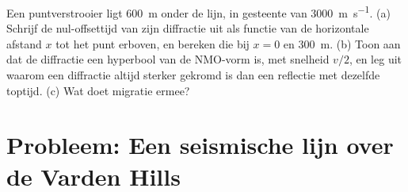 \begin{exercise}[$\star\star\star$]\label{exo:b3:exploration-seismology:12}
Een puntverstrooier ligt \qty{600}{m} onder de lijn, in gesteente van
\qty{3000}{m.s^{-1}}. (a) Schrijf de nul-offsettijd van zijn diffractie uit als functie van
de horizontale afstand $x$ tot het punt erboven, en bereken die bij $x = 0$
en \qty{300}{m}. (b) Toon aan dat de diffractie een hyperbool van de NMO-vorm is,
met snelheid $v/2$, en leg uit waarom een diffractie altijd sterker gekromd is dan een
reflectie met dezelfde toptijd. (c) Wat doet migratie ermee?
\end{exercise}

\section{Probleem: Een seismische lijn over de Varden Hills}

